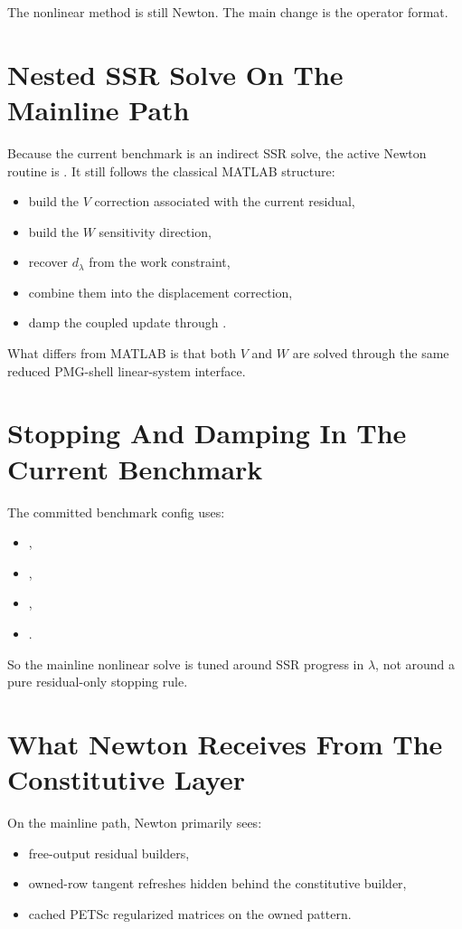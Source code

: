 The nonlinear method is still Newton. The main change is the operator format.

\section{Nested SSR Solve On The Mainline Path}

Because the current benchmark is an indirect SSR solve, the active Newton
routine is . It still follows the classical MATLAB
structure:
\begin{itemize}
\item build the \(V\) correction associated with the current residual,
\item build the \(W\) sensitivity direction,
\item recover \(d_\lambda\) from the work constraint,
\item combine them into the displacement correction,
\item damp the coupled update through .
\end{itemize}

What differs from MATLAB is that both \(V\) and \(W\) are solved through the
same reduced PMG-shell linear-system interface.

\section{Stopping And Damping In The Current Benchmark}

The committed benchmark config uses:
\begin{itemize}
\item {},
\item {},
\item {},
\item {}.
\end{itemize}

So the mainline nonlinear solve is tuned around SSR progress in
\(\lambda\), not around a pure residual-only stopping rule.

\section{What Newton Receives From The Constitutive Layer}

On the mainline path, Newton primarily sees:
\begin{itemize}
\item free-output residual builders,
\item owned-row tangent refreshes hidden behind the constitutive builder,
\item cached PETSc regularized matrices on the owned pattern.
\end{itemize}

